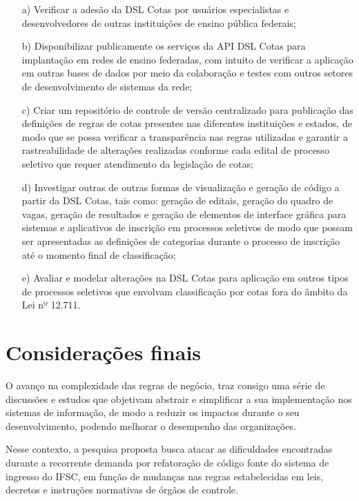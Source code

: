 \begin{enumerate}
    \item [a)] Verificar a adesão da DSL Cotas por usuários especialistas e desenvolvedores de outras instituições de ensino pública federais;
    \item [b)] Disponibilizar publicamente os serviços da API DSL Cotas para implantação em redes de ensino federadas, com intuito de verificar a aplicação em outras bases de dados por meio da colaboração e testes com outros setores de desenvolvimento de sistemas da rede; 
    \item [c)] Criar um repositório de controle de versão centralizado para publicação das definições de regras de cotas presentes nas diferentes instituições e estados, de modo que se possa verificar a transparência nas regras utilizadas e garantir a rastreabilidade de alterações realizadas conforme cada edital de processo seletivo que requer atendimento da legislação de cotas;
    \item [d)] Investigar outras de outras formas de visualização e geração de código a partir da DSL Cotas, tais como: geração de editais, geração do quadro de vagas, geração de resultados e geração de elementos de interface gráfica para sistemas e aplicativos de inscrição em processos seletivos de modo que possam ser apresentadas as definições de categorias durante o processo de inscrição até o momento final de classificação;
    \item [e)] Avaliar e modelar alterações na DSL Cotas para aplicação em outros tipos de processos seletivos que envolvam classificação por cotas fora do âmbito da Lei nº 12.711.
\end{enumerate}

\section{Considerações finais}
\label{considfinal}

O avanço na complexidade das regras de negócio, traz consigo uma série de discussões e estudos que objetivam abstrair e simplificar a sua implementação nos sistemas de informação, de modo a reduzir os impactos durante o seu desenvolvimento, podendo melhorar o desempenho das organizações.   

Nesse contexto, a pesquisa proposta busca atacar as dificuldades encontradas durante a recorrente demanda por refatoração de código fonte do sistema de ingresso do \gls{IFSC}, em função de mudanças nas regras estabelecidas em leis, decretos e instruções normativas de órgãos de controle.


